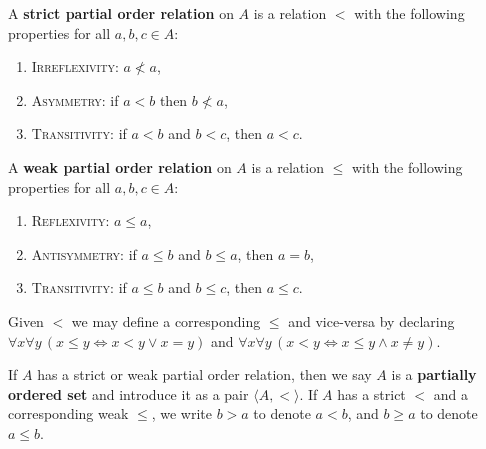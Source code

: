 \begin{definition}
	A \textbf{strict partial order relation} on $A$ is a relation $<$ with the following properties for all $a, b, c\in A$:
	\begin{enumerate}[itemsep=-0.4ex, label=(P\arabic*)]
		\item \textsc{Irreflexivity:} $a \not< a$,
		\item \textsc{Asymmetry:} if $a < b$ then $b \not< a$,
		\item \textsc{Transitivity:} if $a < b$ and $b < c$, then $a < c$.
	\end{enumerate}
	A \textbf{weak partial order relation} on $A$ is a relation $\le$ with the following properties for all $a, b, c\in A$:
	\begin{enumerate}[itemsep=-0.4ex, label=(P\arabic*$'$)]
		\item \textsc{Reflexivity:} $a\le a$,
		\item \textsc{Antisymmetry:} if $a\le b$ and $b\le a$, then $a = b$,
		\item \textsc{Transitivity:} if $a\le b$ and $b\le c$, then $a\le c$.
	\end{enumerate}
	Given $<$ we may define a corresponding $\le$ and vice-versa by declaring $\forall x\forall y\, (x\le y\iff x < y\lor x=y)$ and $\forall x\forall y\, (x < y\iff x\le y\land x\ne y)$. 
\end{definition}

If $A$ has a strict or weak partial order relation, then we say $A$ is a \textbf{partially ordered set} and introduce it as a pair $\langle A, <\rangle$.
If $A$ has a strict $<$ and a corresponding weak $\le$, we write $b > a$ to denote $a < b$, and $b\ge a$ to denote $a\le b$. 

